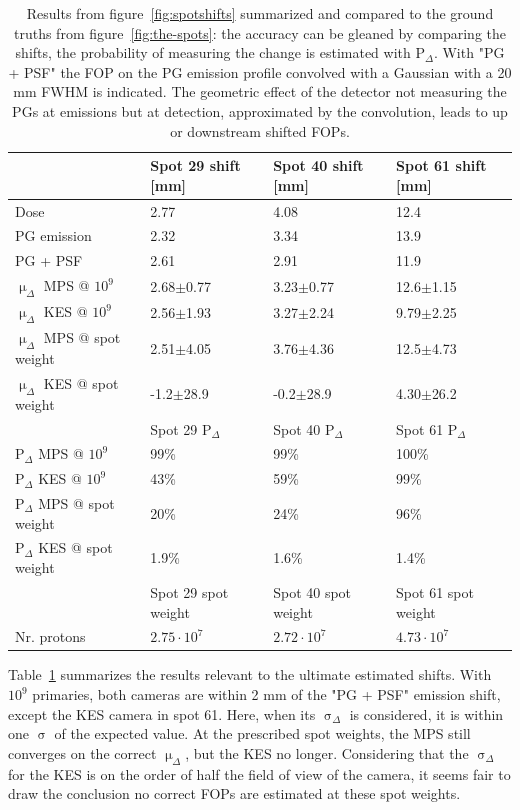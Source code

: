 \documentclass[a4paper,english]{article}
\begin{document}
\begin{table}
\centering
\begin{tabular}{llll}
	 & Spot 29 shift [mm] & Spot 40 shift [mm] & Spot 61 shift [mm]\\
	\midrule
	Dose & 2.77 & 4.08 & 12.4\\
	PG emission & 2.32 & 3.34 & 13.9\\
	PG + PSF & 2.61 & 2.91 & 11.9\\
	$\upmu_\Delta$ MPS @ $10^9$      & 2.68$\pm$0.77 & 3.23$\pm$0.77 & 12.6$\pm$1.15 \\
	$\upmu_\Delta$ KES @ $10^9$      & 2.56$\pm$1.93 & 3.27$\pm$2.24 & 9.79$\pm$2.25 \\
	$\upmu_\Delta$ MPS @ spot weight & 2.51$\pm$4.05 & 3.76$\pm$4.36 & 12.5$\pm$4.73 \\
	$\upmu_\Delta$ KES @ spot weight & -1.2$\pm$28.9 & -0.2$\pm$28.9 & 4.30$\pm$26.2 \\
	\midrule
	 & Spot 29 P$_\Delta$ & Spot 40 P$_\Delta$ & Spot 61 P$_\Delta$\\
	\midrule
	P$_\Delta$ MPS @ $10^9$      & 99\%  & 99\% & 100\% \\
	P$_\Delta$ KES @ $10^9$      & 43\%  & 59\% & 99\% \\
	P$_\Delta$ MPS @ spot weight & 20\%  & 24\% & 96\% \\
	P$_\Delta$ KES @ spot weight & 1.9\% & 1.6\% & 1.4\% \\
	\midrule
	 & Spot 29 spot weight & Spot 40 spot weight & Spot 61 spot weight\\
	\midrule
	Nr. protons & $2.75\cdot10^7$ & $2.72\cdot10^7$ & $4.73\cdot10^7$ \\
\end{tabular}
\caption{Results from figure~\ref{fig:spotshifts} summarized and compared to the ground truths from figure~\ref{fig:the-spots}: the accuracy can be gleaned by comparing the shifts, the probability of measuring the change is estimated with P$_\Delta$. With "PG + PSF" the FOP on the PG emission profile convolved with a Gaussian with a 20 mm FWHM is indicated. The geometric effect of the detector not measuring the PGs at emissions but at detection, approximated by the convolution, leads to up or downstream shifted FOPs.}
\label{table:spots}
\end{table}

Table~\ref{table:spots} summarizes the results relevant to the ultimate estimated shifts. With $10^9$ primaries, both cameras are within 2 mm of the "PG + PSF" emission shift, except the KES camera in spot 61. Here, when its $\upsigma_\Delta$ is considered, it is within one $\upsigma$ of the expected value. At the prescribed spot weights, the MPS still converges on the correct $\upmu_\Delta$, but the KES no longer. Considering that the $\upsigma_\Delta$ for the KES is on the order of half the field of view of the camera, it seems fair to draw the conclusion no correct FOPs are estimated at these spot weights.
\end{document}
